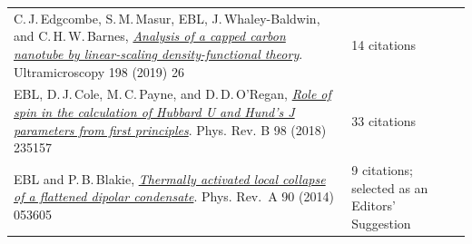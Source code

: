 \documentclass[10pt,a4paper,final]{article}
\begin{document}
\begin{tabularx}{\textwidth}{
      m{}%
      m{}}
   C.\,J.\,Edgcombe, S.\,M.\,Masur, EBL, J.\,Whaley-Baldwin, and C.\,H.\,W.\,Barnes, \href{https://www.sciencedirect.com/science/article/pii/S0304399118302833}{\textit{Analysis of a capped carbon nanotube by linear-scaling density-functional theory}}. Ultramicroscopy 198 (2019) 26                                                                                                                                                                                                                                                                                                                                                                                                                                                                     & 14 citations                                    \\
   EBL, D.\,J.\,Cole, M.\,C.\,Payne, and D.\,D.\,O'Regan, \href{https://journals.aps.org/prb/abstract/10.1103/PhysRevB.98.235157}{\textit{Role of spin in the calculation of Hubbard U and Hund’s J parameters from first principles}}. Phys. Rev. B 98 (2018) 235157                                                                                                                                                                                                                                                                                                                                                                                                                                                                                         & 33 citations                                    \\
   EBL and P.\,B.\,Blakie, \href{https://journals.aps.org/pra/pdf/10.1103/PhysRevA.90.053605}{\textit{Thermally activated local collapse of a flattened dipolar condensate}}. Phys. Rev.~A 90 (2014) 053605                                                                                                                                                                                                                                                                                                                                                                                                                                                                                                                                                   & 9 citations; selected as an Editors' Suggestion
\end{tabularx}
\end{document}
